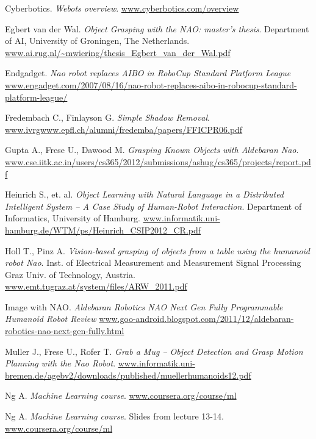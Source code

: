 \begin{thebibliography}{99999}
		Cyberbotics.
		\emph{Webots overview}.
		\url{www.cyberbotics.com/overview}

		Egbert van der Wal.
		\emph{Object Grasping with the NAO: master's thesis}.
		Department of AI, 
		University of Groningen,
		The Netherlands.
		\url{www.ai.rug.nl/~mwiering/thesis\_Egbert\_van\_der\_Wal.pdf}

		Endgadget.
		\emph{Nao robot replaces AIBO in RoboCup Standard Platform League}
		\url{www.engadget.com/2007/08/16/nao-robot-replaces-aibo-in-robocup-standard-platform-league/}

		Fredembach C., Finlayson G.
		\emph{Simple Shadow Removal}.
		\url{www.ivrgwww.epfl.ch/alumni/fredemba/papers/FFICPR06.pdf}




		Gupta A., Frese U., Dawood M.
		\emph{Grasping Known Objects with Aldebaran Nao}.
		\url{www.cse.iitk.ac.in/users/cs365/2012/submissions/ashug/cs365/projects/report.pdf}

		Heinrich S., et. al.
		\emph{Object Learning with Natural Language in a Distributed Intelligent System --
		A Case Study of Human-Robot Interaction}.
		Department of Informatics,
		University of Hamburg.
		\url{www.informatik.uni-hamburg.de/WTM/ps/Heinrich\_CSIP2012\_CR.pdf}

		Holl T., Pinz A.
		\emph{Vision-based grasping of objects from a table using the humanoid robot Nao}.
		Inst. of Electrical Measurement and Measurement Signal Processing Graz Univ. of Technology, Austria.
		\url{www.emt.tugraz.at/system/files/ARW\_2011.pdf}

		Image with NAO.
		\emph{Aldebaran Robotics NAO Next Gen Fully Programmable Humanoid Robot Review}
		\url{www.goo-android.blogspot.com/2011/12/aldebaran-robotics-nao-next-gen-fully.html}

		Muller J., Frese U., Rofer T.
		\emph{Grab a Mug – Object Detection and Grasp Motion Planning with the Nao Robot}.
		\url{www.informatik.uni-bremen.de/agebv2/downloads/published/muellerhumanoids12.pdf}

		Ng A. 
		\emph{Machine Learning course}.
		\url{www.coursera.org/course/ml}

		Ng A. 
		\emph{Machine Learning course}.
		Slides from lecture 13-14.
		\url{www.coursera.org/course/ml}


\end{thebibliography}
